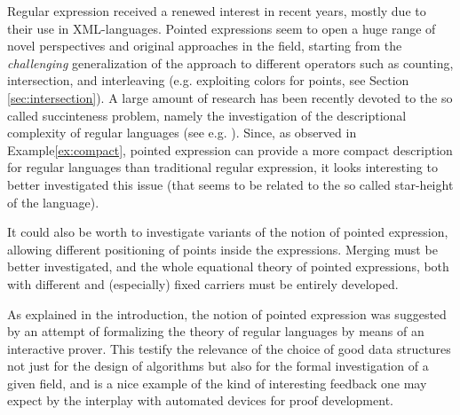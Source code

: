 \documentclass[preprint]{sigplanconf}
\begin{document}
Regular expression received a renewed interest in recent 
years, mostly due to their use in XML-languages. 
Pointed expressions seem to open a huge range of novel 
perspectives and original approaches in the field, starting
from the {\em challenging} generalization of the approach to
different operators such as counting, intersection, 
and interleaving (e.g. exploiting colors for points, 
see Section \ref{sec:intersection}). A large amount
of research has been recently devoted to the so called
succinteness problem, namely the investigation
of the descriptional complexity of regular languages
(see e.g. \cite{Gelade10, GruberH08, HolzerK09}). Since,
as observed in Example\ref{ex:compact}, pointed expression
can provide a more compact description for regular languages
than traditional regular expression, it looks interesting to better 
investigated this issue (that seems to be related to the so called
star-height \cite{eggan63} of the language).




It could also be worth to investigate variants of the
notion of pointed expression, allowing different
positioning of points inside the expressions. 
Merging must be better investigated, and the whole equational
theory of pointed expressions, both with different and
(especially) fixed carriers must be entirely developed.

As explained in the introduction, the notion of pointed 
expression was suggested by an attempt of formalizing the theory
of regular languages by means of an interactive prover.
This testify the relevance of the choice of good data structures 
not just for the design of algorithms but also for the formal 
investigation of a given field, and is a 
nice example of the kind of interesting feedback one may expect 
by the interplay with automated devices for proof development. 






\end{document}
